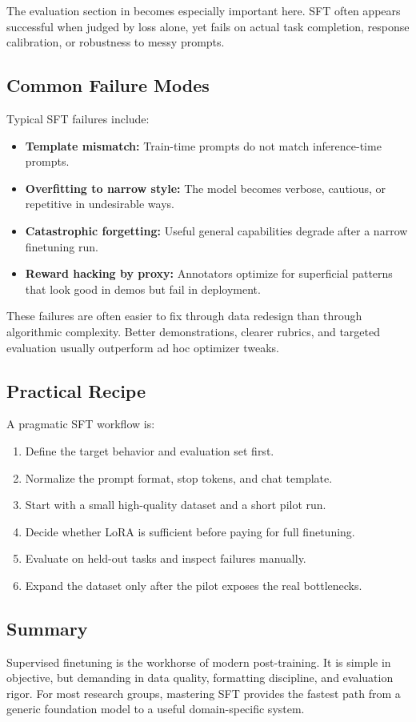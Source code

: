 \documentclass[class=article,crop=false]{standalone}
\begin{document}
The evaluation section in  becomes especially important here. SFT often appears successful when judged by loss alone, yet fails on actual task completion, response calibration, or robustness to messy prompts.

\subsection{Common Failure Modes}
\label{sec:sft:failures}

Typical SFT failures include:
\begin{itemize}
  \item \textbf{Template mismatch:} Train-time prompts do not match inference-time prompts.
  \item \textbf{Overfitting to narrow style:} The model becomes verbose, cautious, or repetitive in undesirable ways.
  \item \textbf{Catastrophic forgetting:} Useful general capabilities degrade after a narrow finetuning run.
  \item \textbf{Reward hacking by proxy:} Annotators optimize for superficial patterns that look good in demos but fail in deployment.
\end{itemize}

These failures are often easier to fix through data redesign than through algorithmic complexity. Better demonstrations, clearer rubrics, and targeted evaluation usually outperform ad hoc optimizer tweaks.

\subsection{Practical Recipe}
\label{sec:sft:recipe}

A pragmatic SFT workflow is:
\begin{enumerate}
  \item Define the target behavior and evaluation set first.
  \item Normalize the prompt format, stop tokens, and chat template.
  \item Start with a small high-quality dataset and a short pilot run.
  \item Decide whether LoRA is sufficient before paying for full finetuning.
  \item Evaluate on held-out tasks and inspect failures manually.
  \item Expand the dataset only after the pilot exposes the real bottlenecks.
\end{enumerate}

\subsection{Summary}
\label{sec:sft:summary}

Supervised finetuning is the workhorse of modern post-training. It is simple in objective, but demanding in data quality, formatting discipline, and evaluation rigor. For most research groups, mastering SFT provides the fastest path from a generic foundation model to a useful domain-specific system.
\end{document}
